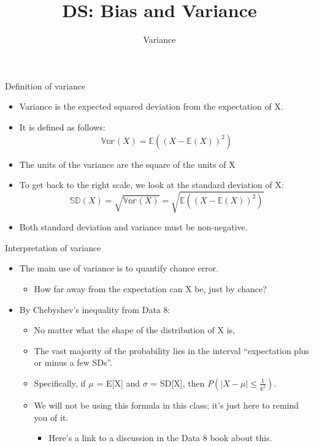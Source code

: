 \documentclass[aspectratio=169]{../latex_main/tntbeamer}  %
\title[Introduction]{DS: Bias and Variance}
\subtitle{Variance}
\begin{document}
	
	\maketitle
	\begin{frame}{Definition of variance}
	    \begin{itemize}
	        \item Variance is the expected squared deviation from the expectation of X.
	        \item It is defined as follows:
	        \begin{equation*}
	            \mathbb{Var}(X) = \mathbb{E}((X - \mathbb{E}(X))^2)
	        \end{equation*}
	        \item The units of the variance are the square of the units of X
	        \item To get back to the right scale, we look at the standard deviation of X:
	        \begin{equation*}
	            \mathbb{SD}(X)  = \sqrt{\mathbb{Var}(X)}  =\sqrt{\mathbb{E}((X - \mathbb{E}(X))^2)}
	        \end{equation*}
	        \item Both standard deviation and variance must be non-negative.
	    \end{itemize}
	\end{frame}
	
	
	\begin{frame}[c]{Interpretation of variance}
	    \begin{itemize}
	        \item The main use of variance is to quantify chance error.
	        \begin{itemize}
	            \item How far away from the expectation can X be, just by chance?
	        \end{itemize}
	        \item By Chebyshev’s inequality from Data 8:
	        \begin{itemize}
	            \item No matter what the shape of the distribution of X is,
	            \item The vast majority of the probability lies in the interval “expectation plus or minus a few SDs”.
	            \item Specifically, if   $\mu$  = E[X] and    $\sigma$   = SD[X], then $P(|X - \mu| \leq \frac{1}{k^2})$.   
	            \item We will not be using this formula in this class; it’s just here to remind you of it.
	            \begin{itemize}
	                \item Here’s a link to a discussion in the Data 8 book about this.
	            \end{itemize}
	        \end{itemize}
	    \end{itemize}
	\end{frame}
	
\end{document}
